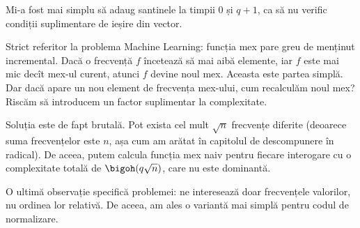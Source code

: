 Mi-a fost mai simplu să adaug santinele la timpii 0 și $q + 1$, ca să nu verific condiții suplimentare de ieșire din vector.

Strict referitor la problema Machine Learning: funcția mex pare greu de menținut incremental. Dacă o frecvență $f$ încetează să mai aibă elemente, iar $f$ este mai mic decît mex-ul curent, atunci $f$ devine noul mex. Aceasta este partea simplă. Dar dacă apare un nou element de frecvența mex-ului, cum recalculăm noul mex? Riscăm să introducem un factor suplimentar la complexitate.

Soluția este de fapt brutală. Pot exista cel mult $\sqrt{n}$ frecvențe diferite (deoarece suma frecvențelor este $n$, așa cum am arătat în capitolul de descompunere în radical). De aceea, putem calcula funcția mex naiv pentru fiecare interogare cu o complexitate totală de $\bigoh(q \sqrt{n})$, care nu este dominantă.

O ultimă observație specifică problemei: ne interesează doar frecvențele valorilor, nu ordinea lor relativă. De aceea, am ales o variantă mai simplă pentru codul de normalizare.
